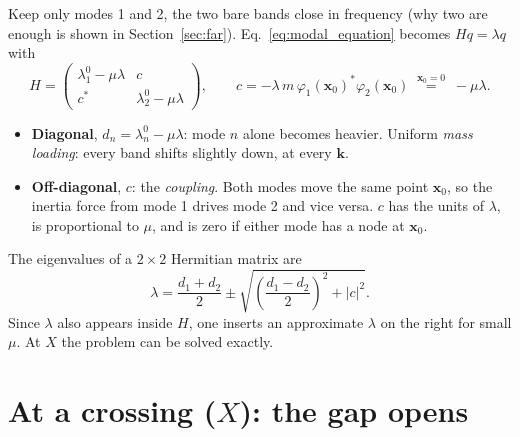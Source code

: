 Keep only modes 1 and 2, the two bare bands close in frequency (why two are
enough is shown in Section~\ref{sec:far}). Eq.~\eqref{eq:modal_equation}
becomes $H q = \lambda q$ with
\begin{equation}
  H = \begin{pmatrix} \lambda_1^0 - \mu\lambda & c \\ c^* & \lambda_2^0 - \mu\lambda \end{pmatrix},
  \qquad
  c = -\lambda\, m\, \varphi_1(\mathbf{x}_0)^* \varphi_2(\mathbf{x}_0)
  \;\overset{\mathbf{x}_0 = 0}{=}\; -\mu\lambda .
\end{equation}
\begin{itemize}
  \item \textbf{Diagonal}, $d_n = \lambda_n^0 - \mu\lambda$: mode $n$ alone
        becomes heavier. Uniform \emph{mass loading}: every band shifts
        slightly down, at every $\mathbf{k}$.
  \item \textbf{Off-diagonal}, $c$: the \emph{coupling}. Both modes move the
        same point $\mathbf{x}_0$, so the inertia force from mode 1 drives
        mode 2 and vice versa. $c$ has the units of $\lambda$, is proportional
        to $\mu$, and is zero if either mode has a node at $\mathbf{x}_0$.
\end{itemize}
The eigenvalues of a $2\times 2$ Hermitian matrix are
\begin{equation}
  \lambda = \frac{d_1 + d_2}{2} \pm \sqrt{\left(\frac{d_1 - d_2}{2}\right)^2 + |c|^2} .
  \label{eq:two_level}
\end{equation}
Since $\lambda$ also appears inside $H$, one inserts an approximate $\lambda$
on the right for small $\mu$. At $X$ the problem can be solved exactly.

\section{At a crossing ($X$): the gap opens}

